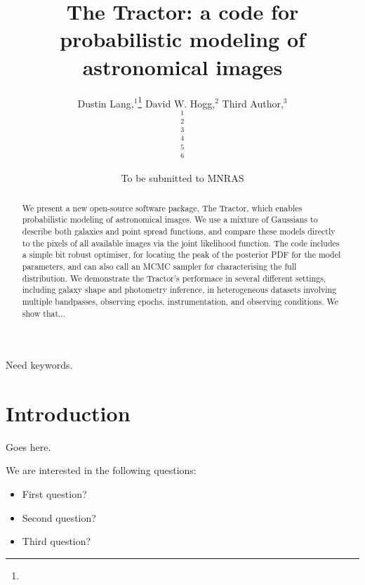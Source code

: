 \documentclass[useAMS,usenatbib]{mn2e}
\title[The Tractor]
{The Tractor: a code for probabilistic modeling of astronomical images}
\author[All of us]{%
  Dustin Lang,$^{1}$\thanks{\email}
  David W. Hogg,$^{2}$
  Third Author,$^{3}$
\newauthor{%
  Fourth Author,$^{4}$
  Fifth Author,$^{5}$
  Sixth Author.$^{6}$}
  \medskip\\
  $^1$\cmu\\
  $^2$\nyu\\
  $^3$\thirdplace\\
  $^4$\fourthplace\\
  $^5$\fifthplace\\
  $^6$\sixthplace\\
}
\begin{document}
             
\date{To be submitted to MNRAS}
             
\pagerange{\pageref{firstpage}--\pageref{lastpage}}

\maketitle

\label{firstpage}


\begin{abstract}

We present a new open-source software package, The Tractor, which enables
probabilistic modeling of astronomical images.  We use a mixture of Gaussians
to describe both galaxies and point spread functions, and compare these models
directly to the pixels of all available images via the joint likelihood
function. The code includes a simple bit robust optimiser, for locating the
peak of the posterior PDF for the model parameters, and can also call an MCMC
sampler for characterising the full distribution.
We demonstrate the Tractor's performace in several
different settings, including galaxy shape and photometry inference, in
heterogeneous datasets involving multiple bandpasses, observing epochs,
instrumentation, and observing conditions. We show that...

\end{abstract}

\begin{keywords}
  Need keywords.
\end{keywords}


\section{Introduction}

Goes here.

We are interested in the following questions:

\begin{itemize}

\item First question?

\item Second question? 

\item Third question? 

\end{itemize}
\end{document}
